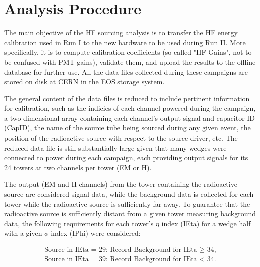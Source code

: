 \section{Analysis Procedure}
The main objective of the HF sourcing analysis is to transfer the HF energy
calibration used in Run I to the new hardware to be used during Run II. More
specifically, it is to compute calibration coefficients (so called "HF
Gains", not to be confused with PMT gains), validate them, and upload the
results to the offline database for further use. All the data files
collected during these campaigns are stored on disk at CERN in the EOS
storage system.

The general content of the data files is reduced to include pertinent
information for calibration, such as the indicies of each channel powered
during the campaign, a two-dimensional array containing each channel's
output signal and capacitor ID (CapID), the name of the source tube being
sourced during any given event, the position of the radioactive source
with respect to the source driver, etc. The reduced data file is still
substantially large given that many wedges were connected to power during
each campaign, each providing output signals for its 24 towers at two
channels per tower (EM or H).

The output (EM and H channels) from the tower containing the
radioactive source are considered signal data, while the background data
is collected for each tower while the radioactive source is sufficiently
far away. To guarantee that the radioactive source is sufficiently distant
from a given tower measuring background data, the following requirements for each tower's $\eta$ index (IEta) for a wedge half with a given $\phi$ index (IPhi) were considered:
\begin{center}
   \begin{eqnarray}
      \label{eq:Tower_Cuts}
      \textrm{Source in IEta = 29: Record Background for IEta $\ge$ 34,} \\
      \textrm{Source in IEta = 39: Record Background for IEta $<$ 34.} \nonumber
   \end{eqnarray}
\end{center}

